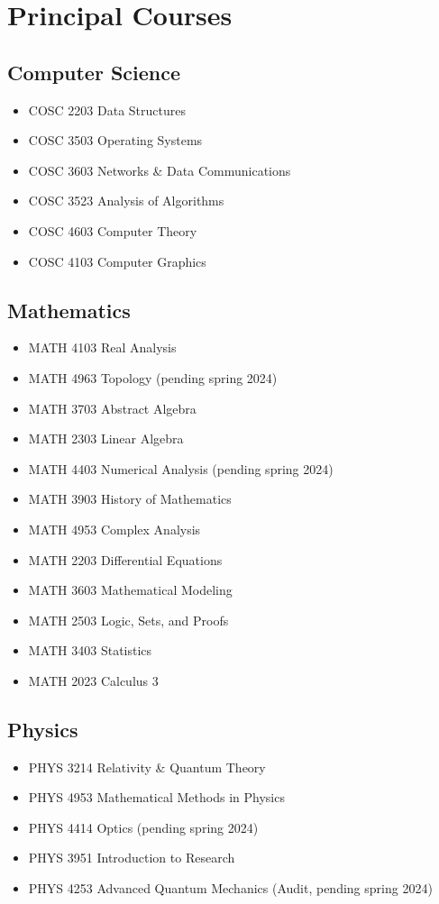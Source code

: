 \documentclass[a4paper, 11pt]{article}
\begin{document}
    \section*{Principal Courses}\label{sec:principal_courses}
    \subsection*{Computer Science}\label{sec:cs_courses}
    \begin{itemize}
        \item COSC 2203 Data Structures
        \item COSC 3503 Operating Systems
        \item COSC 3603 Networks \& Data Communications
        \item COSC 3523 Analysis of Algorithms
        \item COSC 4603 Computer Theory
        \item COSC 4103 Computer Graphics
    \end{itemize}
    \subsection*{Mathematics}\label{sec:math_courses}
    \begin{itemize}
        \item MATH 4103 Real Analysis
        \item MATH 4963 Topology \hfill(pending spring 2024)
        \item MATH 3703 Abstract Algebra
        \item MATH 2303 Linear Algebra
        \item MATH 4403 Numerical Analysis \hfill(pending spring 2024)
        \item MATH 3903 History of Mathematics
        \item MATH 4953 Complex Analysis
        \item MATH 2203 Differential Equations
        \item MATH 3603 Mathematical Modeling
        \item MATH 2503 Logic, Sets, and Proofs
        \item MATH 3403 Statistics
        \item MATH 2023 Calculus 3
    \end{itemize}
    \subsection*{Physics}\label{sec:physics_courses}
    \begin{itemize}
        \item PHYS 3214 Relativity \& Quantum Theory
        \item PHYS 4953 Mathematical Methods in Physics
        \item PHYS 4414 Optics \hfill(pending spring 2024)
        \item PHYS 3951 Introduction to Research
        \item PHYS 4253 Advanced Quantum Mechanics (Audit, pending spring 2024)
    \end{itemize}
    
\end{document}
